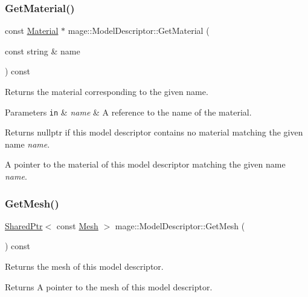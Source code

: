 \subsubsection{\texorpdfstring{Get\+Material()}{GetMaterial()}}
{\footnotesize\ttfamily const \hyperlink{classmage_1_1_material}{Material} $\ast$ mage\+::\+Model\+Descriptor\+::\+Get\+Material (\begin{DoxyParamCaption}\item[{const string \&}]{name }\end{DoxyParamCaption}) const\hspace{0.3cm}{\ttfamily [noexcept]}}

Returns the material corresponding to the given name.


\begin{DoxyParams}[1]{Parameters}
\mbox{\tt in}  & {\em name} & A reference to the name of the material. \\
\hline
\end{DoxyParams}
\begin{DoxyReturn}{Returns}
{\ttfamily nullptr} if this model descriptor contains no material matching the given name {\itshape name}. 

A pointer to the material of this model descriptor matching the given name {\itshape name}. 
\end{DoxyReturn}
\hypertarget{classmage_1_1_model_descriptor_a730dedd388929c74ed504395ad2601fc}{}\label{classmage_1_1_model_descriptor_a730dedd388929c74ed504395ad2601fc} 
\subsubsection{\texorpdfstring{Get\+Mesh()}{GetMesh()}}
{\footnotesize\ttfamily \hyperlink{namespacemage_a1e01ae66713838a7a67d30e44c67703e}{Shared\+Ptr}$<$ const \hyperlink{classmage_1_1_mesh}{Mesh} $>$ mage\+::\+Model\+Descriptor\+::\+Get\+Mesh (\begin{DoxyParamCaption}{ }\end{DoxyParamCaption}) const\hspace{0.3cm}{\ttfamily [noexcept]}}

Returns the mesh of this model descriptor.

\begin{DoxyReturn}{Returns}
A pointer to the mesh of this model descriptor. 
\end{DoxyReturn}
\hypertarget{classmage_1_1_model_descriptor_a9c8e98d71883edd33b9d6c1964e7bf36}{}\label{classmage_1_1_model_descriptor_a9c8e98d71883edd33b9d6c1964e7bf36} 
